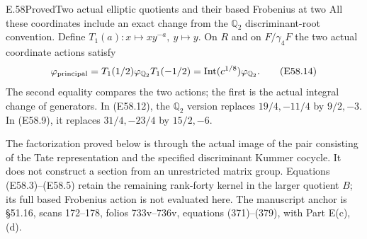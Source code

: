\begin{statement}{E.58}{Proved}{Two actual elliptic quotients and their based Frobenius at two}
All these coordinates include an exact change from the
$\mathbb Q_2$ discriminant-root convention. Define
$T_1(a):x\mapsto xy^{-a},\ y\mapsto y$.
On $R$ and on $F/\gamma_4F$ the two actual coordinate actions satisfy
\[
 \varphi_{\rm principal}
    =T_1(1/2)\varphi_{\mathbb Q_2}T_1(-1/2)
    =\operatorname{Int}(c^{1/8})\varphi_{\mathbb Q_2}.
 \tag{E58.14}
\]
The second equality compares the two actions; the first is the
actual integral change of generators. In (E58.12), the
$\mathbb Q_2$ version replaces $19/4,-11/4$ by $9/2,-3$.
In (E58.9), it replaces $31/4,-23/4$ by $15/2,-6$.

The factorization proved below is through the actual image of
the pair consisting of the Tate representation and the specified
discriminant Kummer cocycle. It does not construct a section from
an unrestricted matrix group. Equations (E58.3)--(E58.5) retain the
remaining rank-forty kernel in the larger quotient $B$; its full
based Frobenius action is not evaluated here. The manuscript anchor
is \S51.16, scans 172--178, folios 733v--736v, equations
(371)--(379), with Part E(c),(d).
\end{statement}


